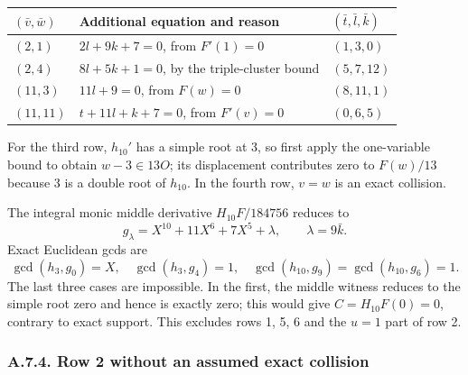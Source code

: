 \documentclass[
  british,
  10pt,
  a4paper,
]{article}
\newcounter{none} %
\begin{document}
{\def\LTcaptype{none} %
\begin{longtable}[]{@{}
  >{\raggedright\arraybackslash}p{}
  >{\raggedright\arraybackslash}p{}
  >{\raggedright\arraybackslash}p{}@{}}
\toprule\noalign{}
\begin{minipage}[b]{\linewidth}\raggedright
\((\bar v,\bar w)\)
\end{minipage} & \begin{minipage}[b]{\linewidth}\raggedright
Additional equation and reason
\end{minipage} & \begin{minipage}[b]{\linewidth}\raggedright
\((\bar t,\bar l,\bar k)\)
\end{minipage} \\
\midrule\noalign{}
\endhead
\bottomrule\noalign{}
\endlastfoot
\((2,1)\) & \(2l+9k+7=0\), from \(F'(1)=0\) & \((1,3,0)\) \\
\((2,4)\) & \(8l+5k+1=0\), by the triple-cluster bound & \((5,7,12)\) \\
\((11,3)\) & \(11l+9=0\), from \(F(w)=0\) & \((8,11,1)\) \\
\((11,11)\) & \(t+11l+k+7=0\), from \(F'(v)=0\) & \((0,6,5)\) \\
\end{longtable}
}

For the third row, \(h_{10}'\) has a simple root at 3, so first apply
the one-variable bound to obtain \(w-3\in13O\); its displacement
contributes zero to \(F(w)/13\) because 3 is a double root of
\(h_{10}\). In the fourth row, \(v=w\) is an exact collision.

The integral monic middle derivative \(H_{10}F/184756\) reduces to \[
g_\lambda=X^{10}+11X^6+7X^5+\lambda,\qquad \lambda=9\bar k.
\] Exact Euclidean gcds are \[
\gcd(h_3,g_0)=X,\quad\gcd(h_3,g_4)=1,\quad
\gcd(h_{10},g_9)=\gcd(h_{10},g_6)=1.
\tag{S20}
\] The last three cases are impossible. In the first, the middle witness
reduces to the simple root zero and hence is exactly zero; this would
give \(C=H_{10}F(0)=0\), contrary to exact support. This excludes rows
1, 5, 6 and the \(u=1\) part of row 2.

\subsubsection*{A.7.4. Row 2 without an assumed exact
collision}\label{a.7.4.-row-2-without-an-assumed-exact-collision}
\end{document}
